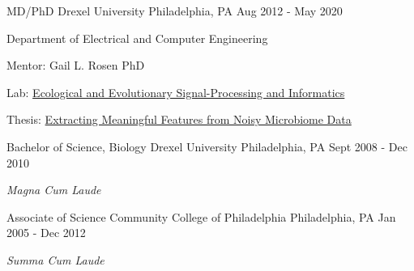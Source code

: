 

\begin{cventries}

  \cventry
    {MD/PhD} %
    {Drexel University} %
    {Philadelphia, PA} %
    {Aug 2012 - May 2020} %
    {
      \begin{cvitems} %
         \item Department of Electrical and Computer Engineering
         \item Mentor: Gail L. Rosen PhD
         \item Lab: \href{http://drexeleesi.com/}{Ecological and Evolutionary Signal-Processing and Informatics}
	 \item Thesis: \href{https://idea.library.drexel.edu/islandora/object/idea\%3A8189}{Extracting Meaningful Features from Noisy Microbiome Data}
      \end{cvitems}
    }
  \cventry
    {Bachelor of Science, Biology} %
    {Drexel University} %
    {Philadelphia, PA} %
    {Sept 2008 - Dec 2010} %
    {
      \begin{cvitems} %
         \item \textit{Magna Cum Laude}
      \end{cvitems}
    }
  \cventry
    {Associate of Science} %
    {Community College of Philadelphia} %
    {Philadelphia, PA} %
    {Jan 2005 - Dec 2012} %
    {
      \begin{cvitems} %
         \item \textit{Summa Cum Laude}
      \end{cvitems}
    }

\end{cventries}
